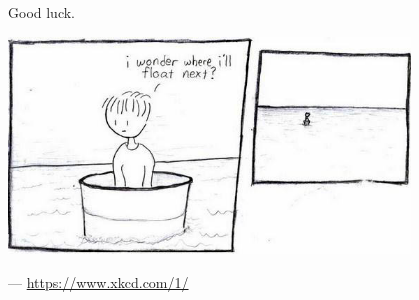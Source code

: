 Good luck.

\begin{center}
  \includegraphics[width=0.8\textwidth]{barrel}
\end{center}
\begin{flushright}--- \url{https://www.xkcd.com/1/}\end{flushright}



